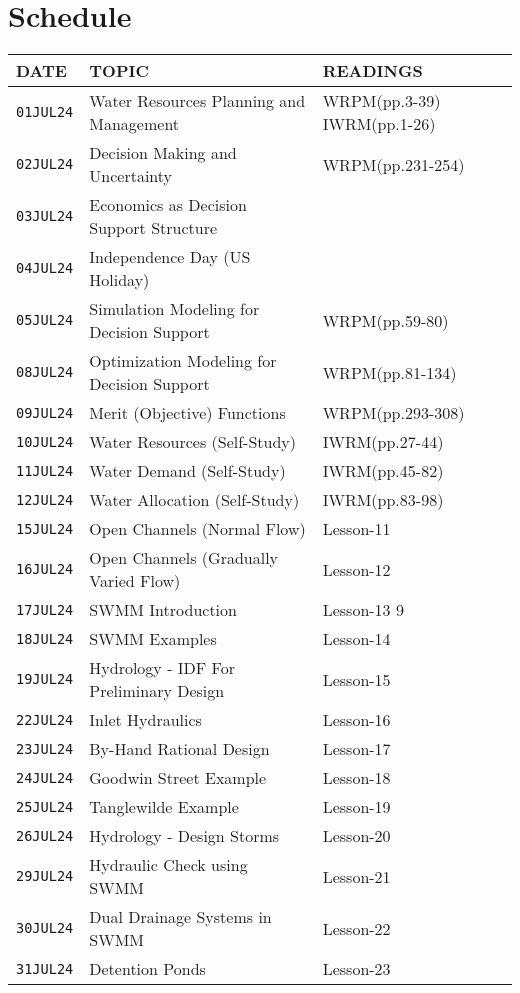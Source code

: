 \documentclass[12pt]{article}
\begin{document}
\section*{Schedule}
\begin{center}
\begin{table}[ht!]
   \begin{tabular}{| p{0.8in} | p{3.4in} | p{2.0in} |} 
\hline
\hline
DATE & TOPIC & READINGS  \\
\hline
\hline
\texttt{01JUL24} & Water Resources Planning and Management & WRPM(pp.3-39) IWRM(pp.1-26)  \\
\texttt{02JUL24} & Decision Making and Uncertainty &   WRPM(pp.231-254) ~~~~ \\
\texttt{03JUL24} & Economics as Decision Support Structure & \cite{JamesLee1971} ~~~~\\
\texttt{04JUL24} & Independence Day (US Holiday) &   \\
\texttt{05JUL24} & Simulation Modeling for Decision Support  & WRPM(pp.59-80)  \\
\hline
\hline
\texttt{08JUL24} & Optimization Modeling for Decision Support  & WRPM(pp.81-134)  \\
\texttt{09JUL24} & Merit (Objective) Functions & WRPM(pp.293-308)  \\
\texttt{10JUL24} & Water Resources (Self-Study) &  IWRM(pp.27-44)  \\
\texttt{11JUL24} & Water Demand (Self-Study) & IWRM(pp.45-82) \\
\texttt{12JUL24} & Water Allocation (Self-Study) & IWRM(pp.83-98)  \\
\hline
\hline
\texttt{15JUL24} & Open Channels (Normal Flow) & Lesson-11   \\
\texttt{16JUL24} & Open Channels (Gradually Varied Flow) & Lesson-12 \\
\texttt{17JUL24} & SWMM Introduction & Lesson-13 9 \\
\texttt{18JUL24} & SWMM Examples & Lesson-14 \\
\texttt{19JUL24} & Hydrology - IDF For Preliminary Design & Lesson-15  \\
\hline
\hline
\texttt{22JUL24} & Inlet Hydraulics & Lesson-16  \\
\texttt{23JUL24} & By-Hand Rational Design & Lesson-17  \\
\texttt{24JUL24} & Goodwin Street Example & Lesson-18  \\
\texttt{25JUL24} & Tanglewilde Example & Lesson-19  \\
\texttt{26JUL24} & Hydrology - Design Storms & Lesson-20  \\
\hline
\hline
\texttt{29JUL24} & Hydraulic Check using SWMM & Lesson-21  \\
\texttt{30JUL24} & Dual Drainage Systems in SWMM & Lesson-22  \\
\texttt{31JUL24} & Detention Ponds & Lesson-23  \\

\hline
\hline
   \end{tabular}
   \label{tab:fall2013scheduleA}
\end{table}
\end{center}
\end{document}
